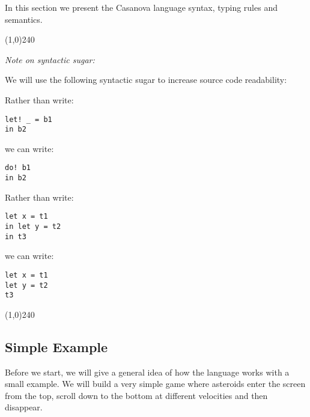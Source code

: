 
In this section we present the Casanova language syntax, typing rules and semantics. 

\begin{center}
\line(1,0){240}
\end{center}

\textit{Note on syntactic sugar:}

We will use the following syntactic sugar to increase source code readability:

Rather than write:

\begin{lstlisting}
let! _ = b1
in b2
\end{lstlisting}

we can write:

\begin{lstlisting}
do! b1
in b2
\end{lstlisting}

Rather than write:

\begin{lstlisting}
let x = t1
in let y = t2
in t3
\end{lstlisting}

we can write:

\begin{lstlisting}
let x = t1
let y = t2
t3
\end{lstlisting}

\begin{comment}
We may also directly iterate all the elements of a table \texttt{t} by writing:

\begin{lstlisting}
for x in t do
  action
\end{lstlisting}

rather than explicitly using indices or \texttt{head} and \texttt{tail}.
\end{comment}

\begin{center}
\line(1,0){240}
\end{center}

\subsection{Simple Example}

Before we start, we will give a general idea of how the language works with a small example. We will build a very simple game where asteroids enter the screen from the top, scroll down to the bottom at different velocities and then disappear.


